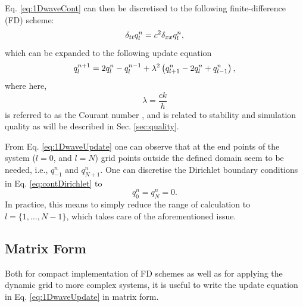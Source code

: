 \documentclass[fleqn]{jaes}
\def\SBcomment[#1]{\textcolor{red}{#1}}
\def\SWcomment[#1]{\textcolor{blue}{#1}}
\begin{document}
Eq. \eqref{eq:1DwaveCont} can then be discretised to the following finite-difference (FD) scheme:
\begin{equation}\label{eq:1dWaveDisc}
    \dtt \qln = c^2 \dxx \qln,
\end{equation}
which can be expanded to the following update equation
\begin{equation}\label{eq:1DwaveUpdate}
    q_l^{n+1} = 2 \qln - q_l^{n-1} + \lambda^2 \left(q_{l+1}^n -2\qln + q_{l-1}^n\right),
\end{equation}
where here, 
\begin{equation}\label{eq:courant}
    \lambda = \frac{c k}{h}
\end{equation} is referred to as the Courant number \cite{Courant1928}, and is related to stability and simulation quality as will be described in Sec. \ref{sec:quality}.

From Eq. \eqref{eq:1DwaveUpdate} one can observe that at the end points of the system ($l=0$, and $l=N$) grid points outside the defined domain seem to be needed, i.e., $q_{-1}^n$ and $q_{N+1}^n$. One can discretise the Dirichlet boundary conditions in Eq. \eqref{eq:contDirichlet} to 
\begin{equation}\label{eq:discDirichlet}
    q_0^n = q_N^n = 0.
\end{equation}
In practice, this means to simply reduce the range of calculation to $l=\{1, \hdots, N-1\}$, which takes care of the aforementioned issue. 

\subsection{Matrix Form}\label{sec:matrixFormOrig}
Both for compact implementation of FD schemes as well as for applying the dynamic grid to more complex systems, it is useful to write the update equation in Eq. \eqref{eq:1DwaveUpdate} in matrix form.
\end{document}
